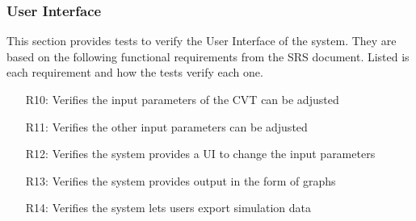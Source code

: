 \documentclass[12pt, titlepage]{article}
\begin{document}
\subsubsection{User Interface}

This section provides tests to verify the User Interface of the system.
They are based on the following functional requirements from the SRS document.
Listed is each requirement and how the tests verify each one.
\begin{itemize}
  \item [R10:] Verifies the input parameters of the CVT can be adjusted
  \item [R11:] Verifies the other input parameters can be adjusted
  \item [R12:] Verifies the system provides a UI to change the input parameters
  \item [R13:] Verifies the system provides output in the form of graphs
  \item [R14:] Verifies the system lets users export simulation data
\end{itemize}
\end{document}
